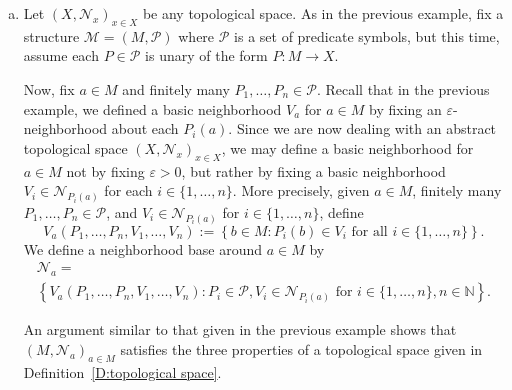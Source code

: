 \documentclass{scrartcl}
\begin{document}
\begin{example}
\begin{enumerate}[(a)]
\begin{proof}
\begin{enumerate}[i)]
\end{enumerate}
\end{proof}

\item Let $(X,\mathscr{N}_x)_{x\in X}$ be any topological space. As in the previous example, fix a structure $\mathscr{M}=(M,\mathscr{P})$ where $\mathscr{P}$ is a set of predicate symbols, but this time, assume each $P\in\mathscr{P}$ is unary of the form $P\colon M\to X$.



Now, fix $a\in M$ and finitely many $P_1,\dots, P_n\in\mathscr{P}$. Recall that in the previous example, we defined a basic neighborhood $V_a$ for $a\in M$ by fixing an $\varepsilon$-neighborhood about each $P_i(a)$. Since we are now dealing with an abstract topological space $(X,\mathscr{N}_x)_{x\in X}$, we may define a basic neighborhood for $a\in M$ not by fixing $\varepsilon>0$, but rather by fixing a basic neighborhood $V_{i}\in\mathscr{N}_{P_i(a)}$ for each $i\in\{1,\dots,n\}$. More precisely, given $a\in M$, finitely many $P_1,\dots,P_n\in\mathscr{P}$, and $V_{i}\in\mathscr{N}_{P_i(a)}$ for $i\in\{1,\dots,n\}$, define 
\[
V_a(P_1,\dots, P_n,V_1,\dots, V_n):= 
\left\{b\in M \colon P_i(b) \in V_i \text{ for all } i\in \{ 1,\dots, n\} \right\}.
\]
We define a neighborhood base around $a\in M$ by 
\begin{multline*}
\mathscr{N}_a = \\
\left\{ V_a(P_1,\dots, P_n,V_1,\dots, V_n) 
\colon 
P_i\in\mathscr{P}, V_{i}\in\mathscr{N}_{P_i(a)} \text{ for $i\in\{1,\dots,n\}$}, n\in\mathbb{N} \right\}\text{.}
\end{multline*}


An argument similar to that given in the previous example shows that $(M,\mathscr{N}_a)_{a\in M}$ satisfies the three properties of a topological space given in Definition~\ref{D:topological space}.


\end{enumerate}
\end{example}
\end{document}
